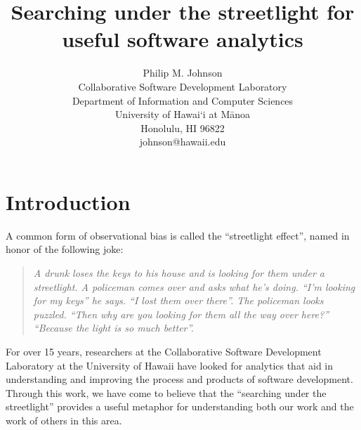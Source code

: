 \documentclass[]{article}
\begin{document}


\title{{\bf Searching under the streetlight for useful software analytics}} 

\author{Philip M. Johnson\\
        Collaborative Software Development Laboratory\\
        Department of Information and Computer Sciences\\
        University of Hawai`i at M\=anoa\\
        Honolulu, HI 96822\\
        johnson@hawaii.edu\\
}


\maketitle

\thispagestyle{empty}


\setlength{\parskip}{3pt plus 1pt minus 1pt} 

\section{Introduction}

A common form of observational bias is called the ``streetlight effect'', named in honor of the
following joke:

\begin{quotation}
{\em A drunk loses the keys to his house and is looking for them under a streetlight. A policeman
comes over and asks what he's doing. ``I'm looking for my keys'' he says. ``I lost them over there''.
The policeman looks puzzled. ``Then why are you looking for them all the way over here?''
``Because the light is so much better''.}
\end{quotation}

For over 15 years, researchers at the Collaborative Software Development Laboratory at the
University of Hawaii have looked for analytics that aid in understanding and improving the
process and products of software development.  Through this work, we have come to believe
that the ``searching under the streetlight'' provides a useful metaphor for understanding both our work and
the work of others in this area. 
\end{document}
